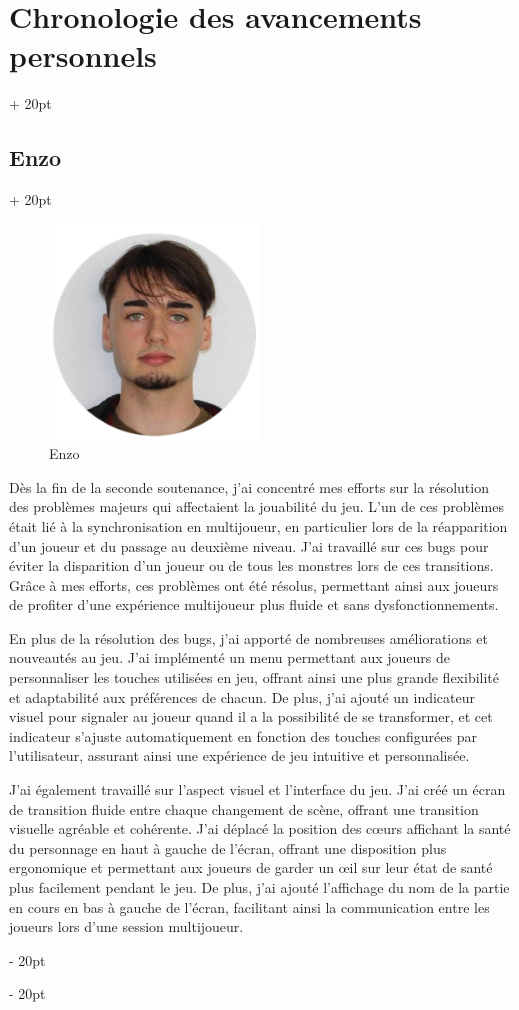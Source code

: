 \documentclass[a4paper, 12pt, twoside]{article}
\newcommand{\ind}[1][20pt]{\advance\leftskip + #1}
\newcommand{\deind}[1][20pt]{\advance\leftskip - #1}
\newenvironment{indt}[2][20pt]{#2 \par \ind[#1]}{\par \deind} %
\begin{document}
\begin{indt}{\section{Chronologie des avancements personnels}}
        \begin{indt}{\subsection{Enzo}}
            \begin{figure}[h]
                \centering
                \includegraphics[width=0.5\textwidth]{enzo.png}
                \caption{Enzo}
                \label{fig:mesh1}
            \end{figure}

            Dès la fin de la seconde soutenance, j'ai concentré mes efforts sur la résolution des problèmes majeurs qui affectaient la jouabilité du jeu. L'un de ces problèmes était lié à la synchronisation en multijoueur, en particulier lors de la réapparition d'un joueur et du passage au deuxième niveau. J'ai travaillé sur ces bugs pour éviter la disparition d'un joueur ou de tous les monstres lors de ces transitions. Grâce à mes efforts, ces problèmes ont été résolus, permettant ainsi aux joueurs de profiter d'une expérience multijoueur plus fluide et sans dysfonctionnements.

            En plus de la résolution des bugs, j'ai apporté de nombreuses améliorations et nouveautés au jeu. J'ai implémenté un menu permettant aux joueurs de personnaliser les touches utilisées en jeu, offrant ainsi une plus grande flexibilité et adaptabilité aux préférences de chacun. De plus, j'ai ajouté un indicateur visuel pour signaler au joueur quand il a la possibilité de se transformer, et cet indicateur s'ajuste automatiquement en fonction des touches configurées par l'utilisateur, assurant ainsi une expérience de jeu intuitive et personnalisée.

            J'ai également travaillé sur l'aspect visuel et l'interface du jeu. J'ai créé un écran de transition fluide entre chaque changement de scène, offrant une transition visuelle agréable et cohérente. J'ai déplacé la position des cœurs affichant la santé du personnage en haut à gauche de l'écran, offrant une disposition plus ergonomique et permettant aux joueurs de garder un œil sur leur état de santé plus facilement pendant le jeu. De plus, j'ai ajouté l'affichage du nom de la partie en cours en bas à gauche de l'écran, facilitant ainsi la communication entre les joueurs lors d'une session multijoueur.


\end{indt}
\end{indt}
\end{document}
